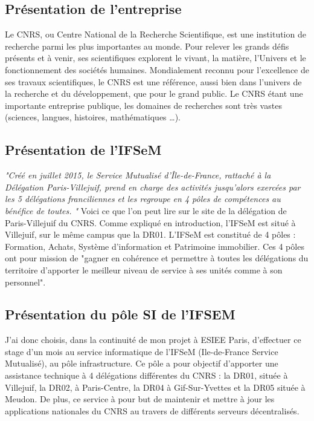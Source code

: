 \subsection{Présentation de l'entreprise}
Le CNRS, ou Centre National de la Recherche Scientifique, est une institution de recherche parmi les plus importantes au monde. Pour relever les grands défis présents et à venir, ses scientifiques explorent le vivant, la matière, l’Univers et le fonctionnement des sociétés humaines. Mondialement reconnu pour l’excellence de ses travaux scientifiques, le CNRS est une référence, aussi bien dans l’univers de la recherche et du développement, que pour le grand public. Le CNRS étant une importante entreprise publique, les domaines de recherches sont très vastes (sciences, langues, histoires, mathématiques \ldots). 

\subsection{Présentation de l'IFSeM}
\textit{"Créé en juillet 2015, le Service Mutualisé d’Île-de-France, rattaché à la Délégation Paris-Villejuif, prend en charge des activités jusqu’alors exercées par les 5 délégations franciliennes et les regroupe en 4 pôles de compétences au bénéfice de toutes\footnotemark. "}
\smallbreak
Voici ce que l'on peut lire sur le site de la délégation de Paris-Villejuif du CNRS. Comme expliqué en introduction, l'IFSeM est situé à Villejuif, sur le même campus que la DR01. L'IFSeM est constitué de 4 pôles : Formation, Achats, Système d'information et Patrimoine immobilier. Ces 4 pôles ont pour mission de "gagner en cohérence et permettre à toutes les délégations du territoire d’apporter le meilleur niveau de service à ses unités comme à son personnel".

\subsection{Présentation du pôle SI de l'IFSEM}
J'ai donc choisis, dans la continuité de mon projet à ESIEE Paris, d'effectuer ce stage d'un mois au service informatique de l'IFSeM (Ile-de-France Service Mutualisé), au pôle infrastructure. 
Ce pôle a pour objectif d'apporter une assistance technique à 4 délégations différentes du CNRS : la DR01, située à Villejuif, la DR02, à Paris-Centre, la DR04 à Gif-Sur-Yvettes et la DR05 située à Meudon. De plus, ce service à pour but de maintenir et mettre à jour les applications nationales du CNRS au travers de différents serveurs décentralisés. 
\newpage

